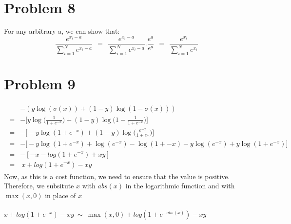 \documentclass[10pt, a4paper, fleqn]{article}
\begin{document}
\section{Problem 8}
For any arbitrary a, we can show that:
\begin{equation*}
\frac{e^\text{$x_i -a$}}{\sum_{i=1}^{N}{e^\text{$x_i-a$}}} \ \ = \ \ \frac{e^\text{$x_i -a$}}{\sum_{i=1}^{N}{e^\text{$x_i-a$}}} . \frac{e^a}{e^a} \ \ = \ \ \frac{e^\text{$x_i$}}{\sum_{i=1}^{N}{e^\text{$x_i$}}}
\end{equation*}
\section{Problem 9}
\begin{eqnarray*}
\begin{aligned}
&-(y \log(\sigma(x)) + (1-y) \log(1-\sigma(x)))\\
=&-\Big[y \log\Big(\frac{1}{1+e^\text{$-x$}}\Big) + (1-y) \log\Big(1-\frac{1}{1+e^\text{$-x$}}\Big)\Big]\\
=& -\Big[-y \log(1+e^\text{$-x$}) + (1-y) \log\Big(\frac{e^\text{$-x$}}{1+e^x}\Big)\Big]\\
=& -\Big[-y \log(1+e^\text{$-x$}) + \log(e^\text{$-x$}) - \log(1 + \text{$-x$}) -y \log(e^\text{$-x$}) + y \log(1 + e^\text{$-x$})\Big]\\
=& -[-x - log(1 + e^\text{$-x$}) + xy]\\
=&\ x + log(1 + e^\text{$-x$}) - xy
\end{aligned}
\end{eqnarray*}
Now, as this is a cost function, we need to ensure that the value is positive. Therefore, we subsitute $x$ with $abs(x)$ in the logarithmic function and with $\max(x,0)$ in place of $x$\\ \\
$x + log(1 + e^\text{$-x$}) - xy \ \sim \ \max(x,0) + log(1 + e^\text{$-abs(x)$}) - xy$
\end{document}
